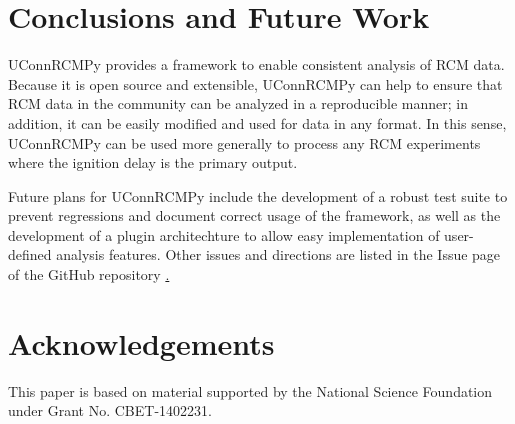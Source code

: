 \documentclass[12pt]{../ussci}
\begin{document}

\section{Conclusions and Future Work}\label{conclusions-and-future-work}

UConnRCMPy provides a framework to enable consistent analysis of RCM
data. Because it is open source and extensible, UConnRCMPy can help to
ensure that RCM data in the community can be analyzed in a reproducible
manner; in addition, it can be easily modified and used for data in any
format. In this sense, UConnRCMPy can be used more generally to process
any RCM experiments where the ignition delay is the primary output.

Future plans for UConnRCMPy include the development of a robust test suite to
prevent regressions and document correct usage of the framework, as well as the
development of a plugin architechture to allow easy implementation of
user-defined analysis features. Other issues and directions are listed in the
Issue page of the GitHub repository
\href{https://github.com/bryanwweber/uconnrcmpy/issues/}.

\section{Acknowledgements}\label{acknowledgements}

This paper is based on material supported by the National Science
Foundation under Grant No. CBET-1402231.

\printbibliography
\end{document}
